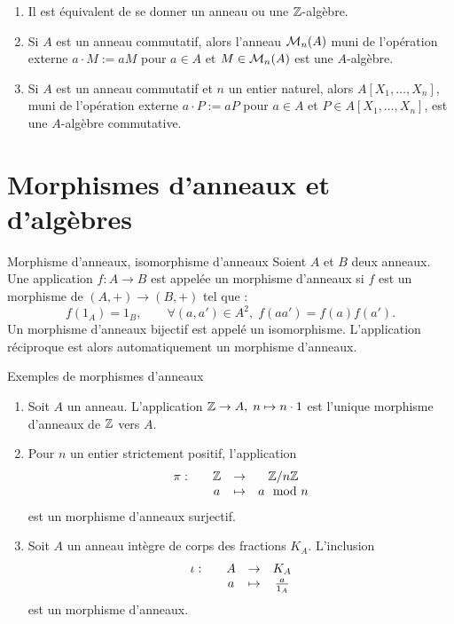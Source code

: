 \documentclass[]{report}
\begin{document}
\begin{ex}{}{}
    \begin{enumerate}
        \item Il est équivalent de se donner un anneau ou une $\mathbb{Z}$-algèbre.
        \item Si $A$ est un anneau commutatif, alors l'anneau $\mathcal{M}_n(A)$ muni de l'opération externe $a \cdot M := aM$ pour $a \in A$ et $M \in \mathcal{M}_n(A)$ est une $A$-algèbre.
        \item Si $A$ est un anneau commutatif et $n$ un entier naturel, alors $A[X_1, \ldots, X_n]$, muni de l'opération externe $a \cdot P := aP$ pour $a \in A$ et $P \in A[X_1, \ldots, X_n]$, est une $A$-algèbre commutative.
    \end{enumerate}
\end{ex}

\section{Morphismes d'anneaux et d'algèbres}

\begin{df}{Morphisme d'anneaux, isomorphisme d'anneaux}{}
    Soient $A$ et $B$ deux anneaux. Une application $f : A \to B$ est appelée un morphisme d'anneaux si $f$ est un morphisme de \grs $(A, +) \to (B, +)$ tel que :
    \[f(1_A) = 1_B, \qquad \forall (a, a') \in A^2, \; f(aa') = f(a)f(a').\]
    Un morphisme d'anneaux bijectif est appelé un isomorphisme. L'application réciproque est alors automatiquement un morphisme d'anneaux.
\end{df}

\begin{ex}{Exemples de morphismes d'anneaux}{}
    \begin{enumerate}
        \item Soit $A$ un anneau. L'application $\mathbb{Z} \to A, \; n \mapsto n \cdot 1$ est l'unique morphisme d'anneaux de $\mathbb{Z}$ vers $A$.
        \item Pour $n$ un entier strictement positif, l'application
        \[\begin{array}{ccccc} \pi : & & \mathbb{Z} & \to & \mathbb{Z}/n\mathbb{Z} \\ & & a & \mapsto & a \mod n \end{array}\]
        est un morphisme d'anneaux surjectif.
        \item Soit $A$ un anneau intègre de corps des fractions $K_A$. L'inclusion
        \[\begin{array}{ccccc} \iota : & & A & \to & K_A \\ & & a & \mapsto & \frac{a}{1_A} \end{array}\]
        est un morphisme d'anneaux.
    \end{enumerate}
\end{ex}
\end{document}
